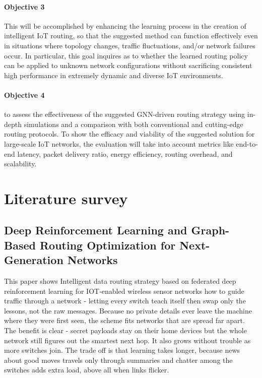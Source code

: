 \documentclass[a4paper,fleqn]{cas-dc}
\numberwithin{equation}{section}
\begin{document}
\paragraph{Objective 3}
\cite{Das2025204}
This will be accomplished by enhancing the learning process in the creation of intelligent IoT routing, so that the suggested method can function effectively even in situations where topology changes, traffic fluctuations, and/or network failures occur. In particular, this goal inquires as to whether the learned routing policy can be applied to unknown network configurations without sacrificing consistent high performance in extremely dynamic and diverse IoT environments.

\paragraph{Objective 4}
\cite{Wei202390}
to assess the effectiveness of the suggested GNN-driven routing strategy using in-depth simulations and a comparison with both conventional and cutting-edge routing protocols. To show the efficacy and viability of the suggested solution for large-scale IoT networks, the evaluation will take into account metrics like end-to-end latency, packet delivery ratio, energy efficiency, routing overhead, and scalability.

\section{Literature survey}
\subsection{Deep Reinforcement Learning and Graph-Based Routing Optimization for Next-Generation Networks}
This paper \cite{Suresh2024} shows Intelligent data routing strategy based on federated deep reinforcement
learning for IOT-enabled wireless sensor networks  how to guide traffic through a network - letting every switch teach itself then swap only the lessons, not the raw messages. Because no private details ever leave the machine where they were first seen, the scheme fits networks that are spread far apart. The benefit is clear - secret payloads stay on their home devices but the whole network still figures out the smartest next hop. It also grows without trouble as more switches join. The trade off is that learning takes longer, because news about good moves travels only through summaries and chatter among the switches adds extra load, above all when links flicker.
\end{document}
